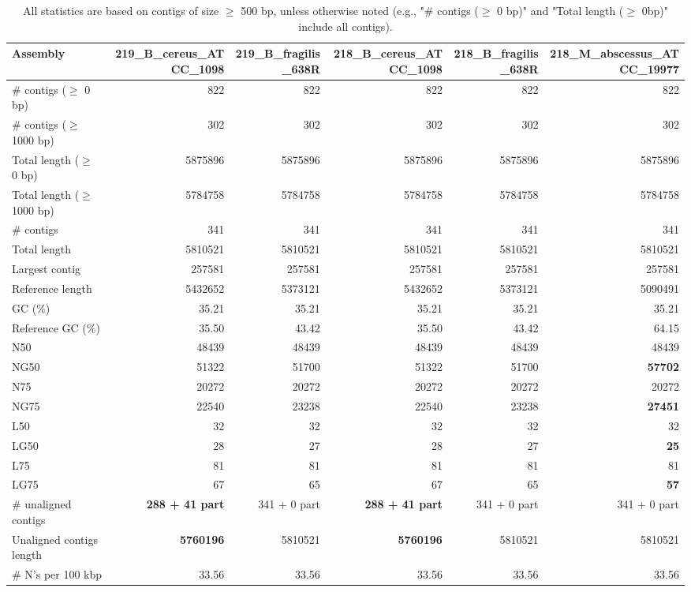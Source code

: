 \documentclass[12pt,a4paper]{article}
\begin{document}
\begin{table}[ht]
\begin{center}
\caption{All statistics are based on contigs of size $\geq$ 500 bp, unless otherwise noted (e.g., "\# contigs ($\geq$ 0 bp)" and "Total length ($\geq$ 0bp)" include all contigs).}
\begin{tabular}{|l*{5}{|r}|}
\hline
Assembly & 219\_B\_cereus\_ATCC\_1098 & 219\_B\_fragilis\_638R & 218\_B\_cereus\_ATCC\_1098 & 218\_B\_fragilis\_638R & 218\_M\_abscessus\_ATCC\_19977 \\ \hline
\# contigs ($\geq$ 0 bp) & 822 & 822 & 822 & 822 & 822 \\ \hline
\# contigs ($\geq$ 1000 bp) & 302 & 302 & 302 & 302 & 302 \\ \hline
Total length ($\geq$ 0 bp) & 5875896 & 5875896 & 5875896 & 5875896 & 5875896 \\ \hline
Total length ($\geq$ 1000 bp) & 5784758 & 5784758 & 5784758 & 5784758 & 5784758 \\ \hline
\# contigs & 341 & 341 & 341 & 341 & 341 \\ \hline
Total length & 5810521 & 5810521 & 5810521 & 5810521 & 5810521 \\ \hline
Largest contig & 257581 & 257581 & 257581 & 257581 & 257581 \\ \hline
Reference length & 5432652 & 5373121 & 5432652 & 5373121 & 5090491 \\ \hline
GC (\%) & 35.21 & 35.21 & 35.21 & 35.21 & 35.21 \\ \hline
Reference GC (\%) & 35.50 & 43.42 & 35.50 & 43.42 & 64.15 \\ \hline
N50 & 48439 & 48439 & 48439 & 48439 & 48439 \\ \hline
NG50 & 51322 & 51700 & 51322 & 51700 & {\bf 57702} \\ \hline
N75 & 20272 & 20272 & 20272 & 20272 & 20272 \\ \hline
NG75 & 22540 & 23238 & 22540 & 23238 & {\bf 27451} \\ \hline
L50 & 32 & 32 & 32 & 32 & 32 \\ \hline
LG50 & 28 & 27 & 28 & 27 & {\bf 25} \\ \hline
L75 & 81 & 81 & 81 & 81 & 81 \\ \hline
LG75 & 67 & 65 & 67 & 65 & {\bf 57} \\ \hline
\# unaligned contigs & {\bf 288 + 41 part} & 341 + 0 part & {\bf 288 + 41 part} & 341 + 0 part & 341 + 0 part \\ \hline
Unaligned contigs length & {\bf 5760196} & 5810521 & {\bf 5760196} & 5810521 & 5810521 \\ \hline
\# N's per 100 kbp & 33.56 & 33.56 & 33.56 & 33.56 & 33.56 \\ \hline
\end{tabular}
\end{center}
\end{table}
\end{document}
